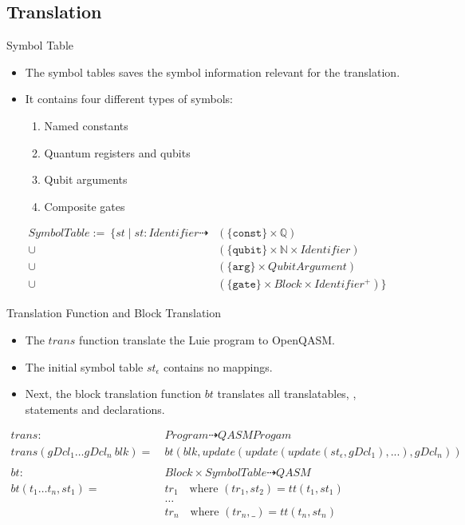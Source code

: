 \subsection{Translation}
\begin{frame}{Symbol Table}
    \begin{itemize}
        \item The symbol tables saves the symbol information relevant for the translation.
        \item It contains four different types of symbols:
        \begin{enumerate}
            \item Named constants
            \item Quantum registers and qubits
            \item Qubit arguments
            \item Composite gates 
        \end{enumerate} 
    \end{itemize}
    \begin{align*}
        SymbolTable := \ \{st \mid st : Identifier \dashrightarrow & (\{\texttt{const}\} \times \mathbb{Q})\\
        \cup& (\{\texttt{qubit}\} \times \mathbb{N} \times Identifier)\\
        \cup& (\{\texttt{arg}\} \times QubitArgument)\\
        \cup& (\{\texttt{gate}\} \times Block \times Identifier^+)
        \}
    \end{align*}
\end{frame}

\begin{frame}{Translation Function and Block Translation}
    \begin{itemize}
        \item The $trans$ function translate the Luie program to OpenQASM.
        \item The initial symbol table $st_\epsilon$ contains no mappings.
        \item Next, the block translation function $bt$ translates all translatables, \ie, statements and declarations.
    \end{itemize}
    \begin{align*}
        trans : \ & Program \dashrightarrow QASMProgam\\
        trans(gDcl_1 \dots gDcl_n \ blk) = \ & bt(blk, update(update(update(st_\epsilon, gDcl_1), ...), gDcl_n))\\
        &\\
        bt : \ & Block \times SymbolTable \dashrightarrow QASM\\
        bt(t_1 \dots t_n, st_1) = \ &  tr_1 \quad \text{where } (tr_1, st_2) = tt(t_1, st_1)\\
        & \dots\\
        & tr_n \quad \text{where } (tr_n, \_) = tt(t_n, st_n)
    \end{align*}
\end{frame}

